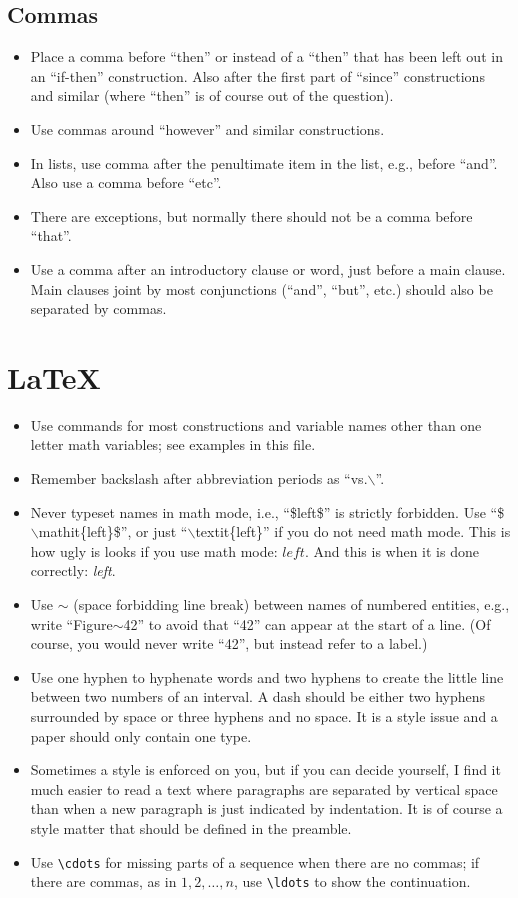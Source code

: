 \documentclass[a4paper,12pt]{report}
\begin{document}
\subsection*{Commas}
\begin{itemize}
\item
Place a comma before ``then'' or instead of a ``then'' that has been left out
in an ``if-then'' construction. Also after the first part of ``since'' constructions and similar (where ``then'' is of course out of the question).
\item
  Use commas around ``however'' and similar constructions.
\item
  In lists, use comma after the penultimate item in the list, e.g., before ``and''. Also use a comma before ``etc''.
\item
  There are exceptions, but normally there should not be a comma before ``that''.
\item
  Use a comma after an introductory clause or word, just before a main clause.
  Main clauses joint by most conjunctions (``and'', ``but'', etc.)
  should also be separated by commas.
\end{itemize}

\section*{\LaTeX{}}
\begin{itemize}
\item
Use commands for most constructions and variable names other than
one letter math variables; see examples in this file.
\item
Remember backslash after abbreviation periods as
``vs.$\backslash$\textvisiblespace''.
\item
Never typeset names in math mode, i.e.,
``{\$}left{\$}'' is strictly forbidden. Use
``{\$}$\backslash{}$mathit\{left\}{\$}'', or just
``$\backslash{}$textit\{left\}'' if you do not need math mode.
This is how ugly is looks if you use math mode: $left$.
And this is when it is done correctly: \textit{left}.
\item
Use $\sim$ (space forbidding line break) between names of numbered
entities, e.g., write ``Figure$\sim$42'' to avoid that ``42'' can
appear at the start of a line. (Of course, you would never write ``42'',
but instead refer to a label.)
\item
Use one hyphen to hyphenate words and two hyphens to create the little line
between two numbers of an interval. A dash should be either two hyphens
surrounded by space or three hyphens and no space. It is a style issue
and a paper should only contain one type.
\item
Sometimes a style is enforced on you, but if you can decide
yourself, I find it much easier to read a text where paragraphs are
separated by vertical space than when a new paragraph is just indicated
by indentation. It is of course a style matter that should be defined
in the preamble.
\item
Use \verb"\cdots" for missing parts of a sequence when there are no commas;
if there are commas, as in $1, 2, \ldots, n$, use \verb"\ldots" to show
the continuation.
\end{itemize}
\end{document}
